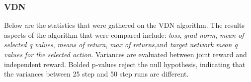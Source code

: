 \documentclass[systems,article,submit,pdftex,moreauthors]{Definitions/mdpi}
\begin{document}
\begin{table}[!h]
\caption{P-values of Bartlett's test for homogeneity of variances for advantage mean of IA2C between 25 timesteps and 50 timesteps.}
\label{tab:ia2c-advantage-mean}
\end{table}


\subsubsection*{VDN}
Below are the statistics that were gathered on the VDN algorithm. The results aspects of the algorithm that were compared include: \textit{loss}, \textit{grad norm}, \textit{mean of selected q values}, \textit{means of return}, \textit{max of returns},and \textit{target network mean q values for the selected action}. 
Variances are evaluated between joint reward and independent reward. Bolded p-values reject the null hypothesis, indicating that the variances between 25 step and 50 step runs are different.


\begin{table}[!h]
\caption{P-values of Bartlett's test for homogeneity of variances for gradient norm values of VDN between 25 timesteps and 50 timesteps grouped by scenario.}
\label{tab:vdn-grad-norm}
\end{table}
\end{document}
